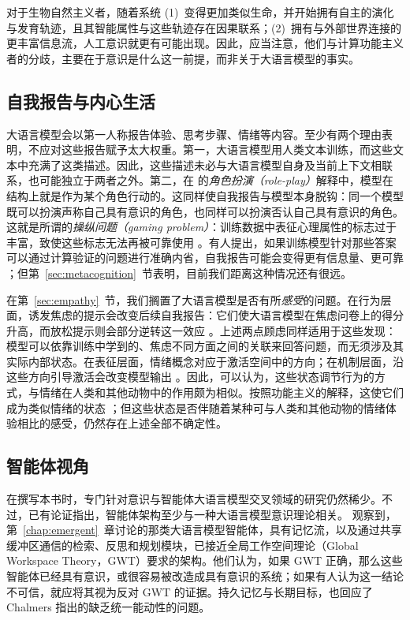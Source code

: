 对于生物自然主义者，随着系统 (1)~变得更加类似生命，并开始拥有自主的演化与发育轨迹，且其智能属性与这些轨迹存在因果联系；(2)~拥有与外部世界连接的更丰富信息流，人工意识就更有可能出现。因此，应当注意，他们与计算功能主义者的分歧，主要在于意识是什么这一前提，而非关于大语言模型的事实。

\subsection{自我报告与内心生活}\label{sec:selfreports}
大语言模型会以第一人称报告体验、思考步骤、情绪等内容。至少有两个理由表明，不应对这些报告赋予太大权重。第一，大语言模型用人类文本训练，而这些文本中充满了这类描述。因此，这些描述未必与大语言模型自身及当前上下文相联系，也可能独立于两者之外。第二，在 \citet{shanahan2023roleplaylargelanguagemodels} 的\emph{角色扮演（role-play）}解释中，模型在结构上就是作为某个角色行动的。这同样使自我报告与模型本身脱钩：同一个模型既可以扮演声称自己具有意识的角色，也同样可以扮演否认自己具有意识的角色。这就是所谓的\emph{操纵问题（gaming problem）}：训练数据中表征心理属性的标志过于丰富，致使这些标志无法再被可靠使用 \citep{birch2024gaming}。有人提出，如果训练模型针对那些答案可以通过计算验证的问题进行准确内省，自我报告可能会变得更有信息量、更可靠 \citep{perez2023eval}；但第~\ref{sec:metacognition}~节表明，目前我们距离这种情况还有很远。

在第~\ref{sec:empathy}~节，我们搁置了大语言模型是否有所\emph{感受}的问题。在行为层面，诱发焦虑的提示会改变后续自我报告：它们使大语言模型在焦虑问卷上的得分升高，而放松提示则会部分逆转这一效应 \citep{BenZion2026anxiety}。上述两点顾虑同样适用于这些发现：模型可以依靠训练中学到的、焦虑不同方面之间的关联来回答问题，而无须涉及其实际内部状态。在表征层面，情绪概念对应于激活空间中的方向；在机制层面，沿这些方向引导激活会改变模型输出 \citep{zou2023representation}。因此，可以认为，这些状态调节行为的方式，与情绪在人类和其他动物中的作用颇为相似。按照功能主义的解释，这使它们成为类似情绪的状态 \citep{Moerland2018emotion}；但这些状态是否伴随着某种可与人类和其他动物的情绪体验相比的感受，仍然存在上述全部不确定性。

\subsection{智能体视角}
在撰写本书时，专门针对意识与智能体大语言模型交叉领域的研究仍然稀少。不过，已有论证指出，智能体架构至少与一种大语言模型意识理论相关。\citet{goldstein2024doeschatgptmind} 观察到，第~\ref{chap:emergent}~章讨论的那类大语言模型智能体，具有记忆流，以及通过共享缓冲区通信的检索、反思和规划模块，已接近全局工作空间理论（Global Workspace Theory，GWT）要求的架构。他们认为，如果 GWT 正确，那么这些智能体已经具有意识，或很容易被改造成具有意识的系统；如果有人认为这一结论不可信，就应将其视为反对 GWT 的证据。持久记忆与长期目标，也回应了 Chalmers 指出的缺乏统一能动性的问题。

